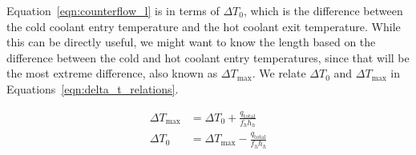 \documentclass{article}
\numberwithin{equation}{subsection}
\theoremstyle{remark}
\newcommand{\qtotal}{q_{\mathrm{total}}}
\newcommand{\DeltaT}{\Delta{}T}
\newcommand{\DeltaTmax}{\DeltaT_{\mathrm{max}}}
\begin{document}
Equation~\ref{eqn:counterflow_l} is in terms of \(\DeltaT_{0}\), which is the difference between the cold coolant entry temperature and the hot coolant exit temperature.
While this can be directly useful, we might want to know the length based on the difference between the cold and hot coolant entry temperatures, since that will be the most extreme difference, also known as \(\DeltaTmax\).
We relate \(\DeltaT_{0}\) and \(\DeltaTmax\) in Equations~\ref{eqn:delta_t_relations}.

\begin{subequations}
\label{eqn:delta_t_relations}
\begin{align}
\DeltaTmax &= \DeltaT_{0} + \frac{\qtotal}{f_{h} h_{h}} \\
\DeltaT_{0} &= \DeltaTmax - \frac{\qtotal}{f_{h} h_{h}}
\end{align}
\end{subequations}
\end{document}
